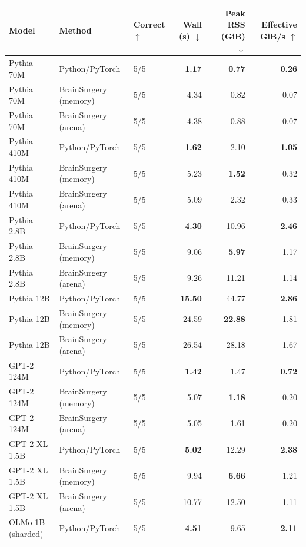 \begin{table}[t]
\centering
\small
\begin{tabular}{lllrrr}
\toprule
\textbf{Model} & \textbf{Method} & \textbf{Correct $\uparrow$} & \textbf{Wall (s) $\downarrow$} & \textbf{Peak RSS (GiB) $\downarrow$} & \textbf{Effective GiB/s $\uparrow$} \\
\midrule
Pythia 70M & Python/PyTorch & 5/5 & \textbf{1.17} & \textbf{0.77} & \textbf{0.26} \\
Pythia 70M & BrainSurgery (memory) & 5/5 & 4.34 & 0.82 & 0.07 \\
Pythia 70M & BrainSurgery (arena) & 5/5 & 4.38 & 0.88 & 0.07 \\
Pythia 410M & Python/PyTorch & 5/5 & \textbf{1.62} & 2.10 & \textbf{1.05} \\
Pythia 410M & BrainSurgery (memory) & 5/5 & 5.23 & \textbf{1.52} & 0.32 \\
Pythia 410M & BrainSurgery (arena) & 5/5 & 5.09 & 2.32 & 0.33 \\
Pythia 2.8B & Python/PyTorch & 5/5 & \textbf{4.30} & 10.96 & \textbf{2.46} \\
Pythia 2.8B & BrainSurgery (memory) & 5/5 & 9.06 & \textbf{5.97} & 1.17 \\
Pythia 2.8B & BrainSurgery (arena) & 5/5 & 9.26 & 11.21 & 1.14 \\
Pythia 12B & Python/PyTorch & 5/5 & \textbf{15.50} & 44.77 & \textbf{2.86} \\
Pythia 12B & BrainSurgery (memory) & 5/5 & 24.59 & \textbf{22.88} & 1.81 \\
Pythia 12B & BrainSurgery (arena) & 5/5 & 26.54 & 28.18 & 1.67 \\
GPT-2 124M & Python/PyTorch & 5/5 & \textbf{1.42} & 1.47 & \textbf{0.72} \\
GPT-2 124M & BrainSurgery (memory) & 5/5 & 5.07 & \textbf{1.18} & 0.20 \\
GPT-2 124M & BrainSurgery (arena) & 5/5 & 5.05 & 1.61 & 0.20 \\
GPT-2 XL 1.5B & Python/PyTorch & 5/5 & \textbf{5.02} & 12.29 & \textbf{2.38} \\
GPT-2 XL 1.5B & BrainSurgery (memory) & 5/5 & 9.94 & \textbf{6.66} & 1.21 \\
GPT-2 XL 1.5B & BrainSurgery (arena) & 5/5 & 10.77 & 12.50 & 1.11 \\
OLMo 1B (sharded) & Python/PyTorch & 5/5 & \textbf{4.51} & 9.65 & \textbf{2.11} \\

\end{tabular}
\end{table}
